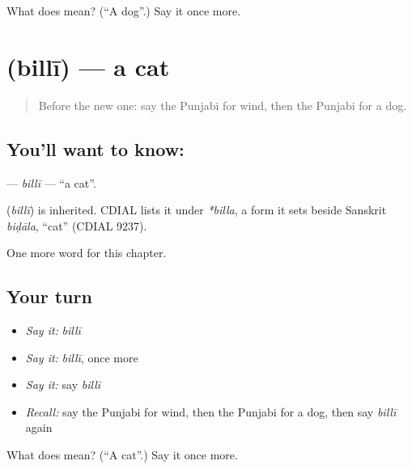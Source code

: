 \begin{tcolorbox}[breakable,colback=teal!4,colframe=teal!35!black,title={Before you move on}]
What does  mean? (\textquotedblleft{}A dog\textquotedblright{}.) Say it once more.
\end{tcolorbox}
\section[\texorpdfstring{\pa{ਬਿੱਲੀ} (billī)}{ਬਿੱਲੀ (billī)}]{ (billī) — a cat}

\label{lesson:PA-C77-billi}



\begin{quote}
Before the new one: say the Punjabi for wind, then the Punjabi for a dog.
\end{quote}

\subsection*{You'll want to know: }
\textbf{} — \emph{billī} — \textquotedblleft{}a cat\textquotedblright{}.

\begin{cousinweb}
\textbf{} (\emph{billī}) is inherited. CDIAL lists it under \emph{*billa}, a form it sets beside Sanskrit \emph{biḍāla}, \textquotedblleft{}cat\textquotedblright{} (CDIAL 9237).
\end{cousinweb}

\begin{grammarlens}[title={What you've built}]
One more word for this chapter.
\end{grammarlens}

\subsection*{Your turn}
\begin{itemize}
\raggedright
  \item \emph{Say it:} \emph{billī}
  \item \emph{Say it:} \emph{billī}, once more
  \item \emph{Say it:} say \emph{billī}
  \item \emph{Recall:} say the Punjabi for wind, then the Punjabi for a dog, then say \emph{billī} again
\end{itemize}

\begin{tcolorbox}[breakable,colback=teal!4,colframe=teal!35!black,title={Before you move on}]
What does  mean? (\textquotedblleft{}A cat\textquotedblright{}.) Say it once more.
\end{tcolorbox}
